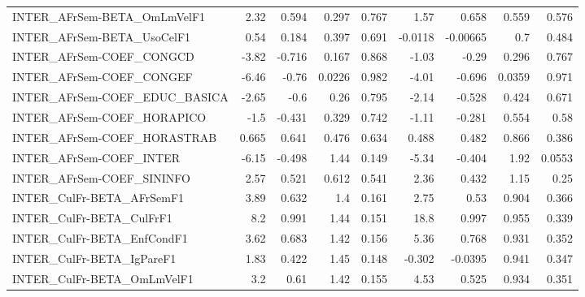 \begin{tabular}{lrrrrrrrr}
INTER\_AFrSem-BETA\_OmLmVelF1           &        2.32 &        0.594 &   0.297 &    0.767 &       1.57 &       0.658 &        0.559 &         0.576 \\
INTER\_AFrSem-BETA\_UsoCelF1            &        0.54 &        0.184 &   0.397 &    0.691 &    -0.0118 &    -0.00665 &          0.7 &         0.484 \\
INTER\_AFrSem-COEF\_CONGCD              &       -3.82 &       -0.716 &   0.167 &    0.868 &      -1.03 &       -0.29 &        0.296 &         0.767 \\
INTER\_AFrSem-COEF\_CONGEF              &       -6.46 &        -0.76 &  0.0226 &    0.982 &      -4.01 &      -0.696 &       0.0359 &         0.971 \\
INTER\_AFrSem-COEF\_EDUC\_BASICA         &       -2.65 &         -0.6 &    0.26 &    0.795 &      -2.14 &      -0.528 &        0.424 &         0.671 \\
INTER\_AFrSem-COEF\_HORAPICO            &        -1.5 &       -0.431 &   0.329 &    0.742 &      -1.11 &      -0.281 &        0.554 &          0.58 \\
INTER\_AFrSem-COEF\_HORASTRAB           &       0.665 &        0.641 &   0.476 &    0.634 &      0.488 &       0.482 &        0.866 &         0.386 \\
INTER\_AFrSem-COEF\_INTER               &       -6.15 &       -0.498 &    1.44 &    0.149 &      -5.34 &      -0.404 &         1.92 &        0.0553 \\
INTER\_AFrSem-COEF\_SININFO             &        2.57 &        0.521 &   0.612 &    0.541 &       2.36 &       0.432 &         1.15 &          0.25 \\
INTER\_CulFr-BETA\_AFrSemF1             &        3.89 &        0.632 &     1.4 &    0.161 &       2.75 &        0.53 &        0.904 &         0.366 \\
INTER\_CulFr-BETA\_CulFrF1              &         8.2 &        0.991 &    1.44 &    0.151 &       18.8 &       0.997 &        0.955 &         0.339 \\
INTER\_CulFr-BETA\_EnfCondF1            &        3.62 &        0.683 &    1.42 &    0.156 &       5.36 &       0.768 &        0.931 &         0.352 \\
INTER\_CulFr-BETA\_IgPareF1             &        1.83 &        0.422 &    1.45 &    0.148 &     -0.302 &     -0.0395 &        0.941 &         0.347 \\
INTER\_CulFr-BETA\_OmLmVelF1            &         3.2 &         0.61 &    1.42 &    0.155 &       4.53 &       0.525 &        0.934 &         0.351 \\

\end{tabular}
